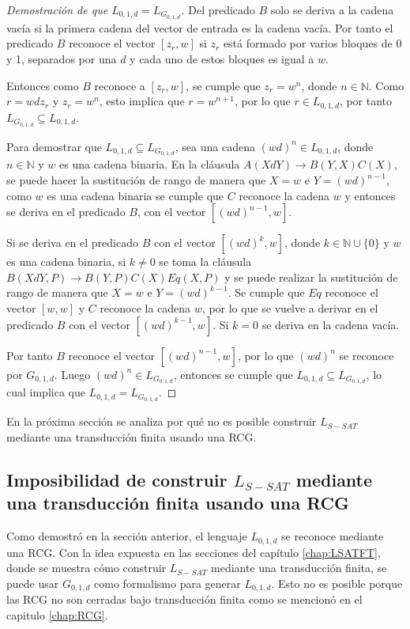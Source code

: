 \documentclass[12pt]{article}
\begin{document}
\begin{proof}[Demostración de que $L_{0,1,d}=L_{G_{0,1,d}}$]
    Del predicado $B$ solo se deriva a la cadena vacía si la primera cadena del vector
    de entrada es la cadena vacía. Por tanto el predicado $B$ reconoce el vector $[z_r,w]$ si $z_r$ está formado 
    por varios bloques de 0 y 1, separados por una $d$ y cada uno de estos bloques es igual a $w$.
    
    Entonces como $B$ reconoce a $[z_r,w]$, se cumple que $z_r=w^n$, donde $n\in \mathbb{N}$. Como
    $r=wdz_r$ y $z_r=w^n$, esto implica que $r=w^{n+1}$, por lo que $r\in L_{0,1,d}$, por tanto 
    $L_{G_{0,1,d}}\subseteq L_{0,1,d}$.
    
    Para demostrar que $L_{0,1,d}\subseteq L_{G_{0,1,d}}$, sea una cadena $(wd)^n\in L_{0,1,d}$, donde 
    $n\in \mathbb{N}$ y $w$ es una cadena binaria. En la cláusula $A(XdY)\to B(Y,X)C(X)$, se puede hacer 
    la sustitución de rango de manera que  $X=w$ e $Y=(wd)^{n-1}$, como $w$ es una cadena binaria se cumple 
    que $C$ reconoce la cadena $w$ y entonces se deriva en el predicado $B$, con el vector $[(wd)^{n-1},w]$.
    
    Si se deriva en el predicado $B$ con el vector $[(wd)^k,w]$, donde 
    $k\in \mathbb{N} \cup \{0\}$ y $w$ es una cadena binaria, si $k\neq 0$ se toma la cláusula
    $B(XdY,P)\to B(Y,P) C(X) Eq(X,P)$ y se puede realizar la sustitución de rango de manera que
    $X=w$ e $Y=(wd)^{k-1}$. Se cumple que $Eq$ reconoce el vector $[w,w]$ y $C$ reconoce la cadena $w$,
    por lo que se vuelve a derivar en el  predicado $B$ con el vector $[(wd)^{k-1},w]$. Si $k=0$ se deriva
    en la cadena vacía.
    
    Por tanto $B$ reconoce el vector $[(wd)^{n-1},w]$, por lo que $(wd)^n$ se reconoce por $G_{0,1,d}$. Luego
    $(wd)^n\in L_{G_{0,1,d}}$, entonces se cumple que $L_{0,1,d}\subseteq L_{G_{0,1,d}}$, lo cual implica
    que $L_{0,1,d} = L_{G_{0,1,d}}$.
\end{proof}

En la próxima sección se analiza por qué no es posible construir $L_{S-SAT}$ mediante una transducción finita usando
una RCG.

\subsection{Imposibilidad de construir $L_{S-SAT}$ mediante una transducción finita usando una RCG}

Como demostró en la sección anterior, el lenguaje $L_{0,1,d}$ se reconoce mediante una RCG. 
Con la idea expuesta en las secciones del capítulo \ref{chap:LSATFT}, donde se muestra cómo construir 
$L_{S-SAT}$ mediante una transducción finita, se puede usar $G_{0,1,d}$ como formalismo para generar 
$L_{0,1,d}$.  Esto no es posible porque las RCG no son cerradas bajo transducción finita como se mencionó 
en el capitulo \ref{chap:RCG}. 
\end{document}
